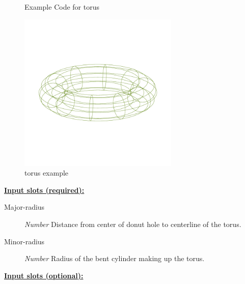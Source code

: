 \documentclass [11pt]{book}
\begin{document}
\begin{itemize}
\begin{figure}
\begin{lrbox}{\boxedverb}
\begin{minipage}{\linewidth}
{\begin{verbatim}
\end{verbatim}}
\end{minipage}
\end{lrbox}
\fbox{\usebox{\boxedverb}}

\caption{Example Code for torus}

\label{fig:example-code-torus}

\end{figure}

\begin{figure}
\begin{center}
\includegraphics[width=3in,height=3in]{../images/example-torus.pdf}
\end{center}

\caption{torus example}

\label{fig:torus}

\end{figure}





\textbf{
\underline{Input slots (required):}}

\begin{description}

\item [Major-radius]
\emph{Number} Distance from center of donut hole to centerline of the torus.


\item [Minor-radius]
\emph{Number} Radius of the bent cylinder making up the torus.


\end{description}






\textbf{
\underline{Input slots (optional):}}


\end{itemize}
\end{document}
